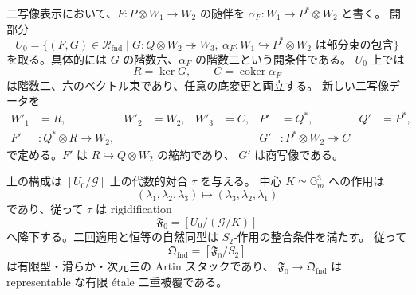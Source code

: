二写像表示において、$F:P\otimes W_1\to W_2$ の随伴を
$\alpha_F:W_1\to P^*\otimes W_2$ と書く。
開部分
\[
 U_0=\{(F,G)\in\mathcal R_{\mathrm{fnd}}\mid
           G:Q\otimes W_2\twoheadrightarrow W_3,
           \ \alpha_F:W_1\hookrightarrow P^*\otimes W_2
           \text{ は部分束の包含}\}
\]
を取る。具体的には $G$ の階数六、$\alpha_F$ の階数二という開条件である。
$U_0$ 上では
\[
 R=\ker G,\qquad C=\operatorname{coker}\alpha_F
\]
は階数二、六のベクトル束であり、任意の底変更と両立する。
新しい二写像データを
\begin{align*}
 W'_1&=R,& W'_2&=W_2,& W'_3&=C,&
 P'&=Q^*,& Q'&=P^*,\\
 F'&:Q^*\otimes R\longrightarrow W_2,&&&&&
 G'&:P^*\otimes W_2\twoheadrightarrow C
\end{align*}
で定める。$F'$ は $R\hookrightarrow Q\otimes W_2$ の縮約であり、
$G'$ は商写像である。

\begin{proposition}
\label{prop:relative-ruling-involution}
上の構成は $[U_0/\mathcal G]$ 上の代数的対合 $\tau$ を与える。
中心 $K\simeq\mathbb G_m^3$ への作用は
\[
 (\lambda_1,\lambda_2,\lambda_3)
 \longmapsto (\lambda_3,\lambda_2,\lambda_1)
\]
であり、従って $\tau$ は rigidification
\[
 \mathfrak F_0=[U_0/(\mathcal G/K)]
\]
へ降下する。二回適用と恒等の自然同型は $S_2$-作用の整合条件を満たす。
従って
\[
 \mathfrak Q_{\mathrm{fnd}}=[\mathfrak F_0/S_2]
\]
は有限型・滑らか・次元三の Artin スタックであり、
$\mathfrak F_0\to\mathfrak Q_{\mathrm{fnd}}$ は representable な有限 étale
二重被覆である。
\end{proposition}

